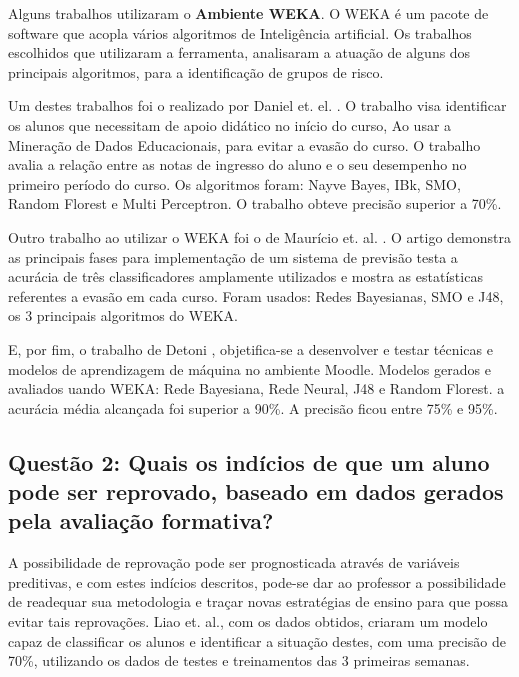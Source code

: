 \documentclass[12pt]{article}
\begin{document}
Alguns trabalhos utilizaram o \textbf{Ambiente WEKA}. O WEKA é um pacote de software que acopla vários algoritmos de Inteligência artificial. Os trabalhos escolhidos que utilizaram a ferramenta, analisaram a atuação de alguns dos principais algoritmos, para a identificação de grupos de risco.

Um destes trabalhos foi o realizado por Daniel et. el. \cite{DeBrito2014}. O trabalho visa identificar os alunos que necessitam de apoio didático no início do curso, Ao usar a Mineração de Dados Educacionais, para evitar a evasão do curso. 
O trabalho avalia a relação entre as notas de ingresso do aluno e o seu desempenho no primeiro período do curso. Os algoritmos foram: Nayve Bayes, IBk, SMO, Random Florest e Multi Perceptron. O trabalho obteve precisão superior a 70\%.

Outro trabalho ao utilizar o WEKA foi o de Maurício et. al. \cite{Amorim2008}. O artigo demonstra as principais fases para implementação de um sistema de previsão testa a acurácia de três classificadores amplamente utilizados e mostra as estatísticas referentes a evasão em cada curso. Foram usados: Redes Bayesianas, SMO e J48, os 3 principais algoritmos do WEKA.

E, por fim, o trabalho de Detoni \cite{Detoni2014}, objetifica-se a desenvolver e testar técnicas e modelos de aprendizagem de máquina no ambiente Moodle. Modelos gerados e avaliados uando WEKA: Rede Bayesiana, Rede Neural, J48 e Random Florest.
a acurácia média alcançada foi superior a 90\%. A precisão ficou entre 75\% e 95\%.


\subsection{\textbf{Questão 2: Quais os indícios de que um aluno pode ser reprovado, baseado em dados gerados pela avaliação formativa? }}


A possibilidade de reprovação pode ser prognosticada através de variáveis preditivas, e com estes indícios descritos, pode-se dar ao professor a possibilidade de readequar sua metodologia e traçar novas estratégias de ensino para que possa evitar tais reprovações. Liao et. al.\cite{Liao2016}, com os dados obtidos, criaram um modelo capaz de classificar os alunos e identificar a situação destes, com uma precisão de 70\%, utilizando os dados de testes e treinamentos das 3 primeiras semanas.
\end{document}

